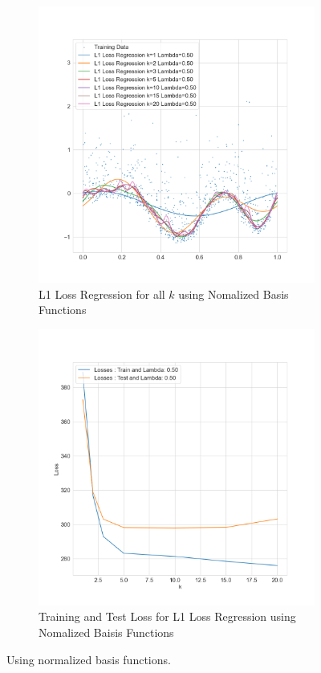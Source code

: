 \documentclass{./tufte-handout}
\begin{document}
\begin{enumerate}[(a)]
\begin{figure}
    \begin{subfigure}[b]{.5\textwidth}
        \includegraphics{../figures/normalized_l1_regression_all_k_lambda_0.50.png}
        \caption{L1 Loss Regression for all $k$ using Nomalized Basis Functions}
    \end{subfigure}%
    \begin{subfigure}[b]{.5\textwidth}
        \includegraphics{../figures/normalized_l1_losses_for_k_lambda_0.50.png}
        \caption{Training and Test Loss for L1 Loss Regression using Nomalized Baisis Functions}
    \end{subfigure}
    \caption{ Using normalized basis functions. }
   \end{figure}
    \FloatBarrier




\end{enumerate}
\end{document}
